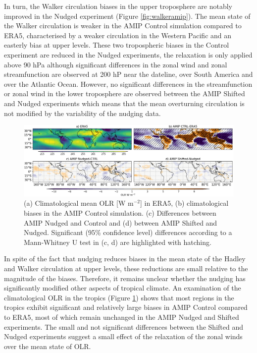 In turn, the Walker circulation biases in the upper troposphere are notably improved in the Nudged experiment (Figure \ref{fig:walkeramip}). The mean state of the Walker circulation is weaker in the AMIP Control simulation compared to ERA5, characterised by a weaker circulation in the Western Pacific and an easterly bias at upper levels. These two tropospheric biases in the Control experiment are reduced in the Nudged experiments, the relaxation is only applied above 90 hPa although significant differences in the zonal wind and zonal streamfunction are observed at 200 hP near the dateline, over South America and over the Atlantic Ocean. 
However, no significant differences in the streamfunction or zonal wind in the lower troposphere are observed between the AMIP Shifted and Nudged experiments which means that the mean overturning circulation is not modified by the variability of the nudging data.

\begin{figure}[b!]
\centering
 \includegraphics[width=\linewidth]{figures/olr_check.png}
\caption[Annual mean OLR  in atmosphere-only experiments]{(a) Climatological mean OLR [W m$^{-2}$] in ERA5, (b) climatological biases in the AMIP Control simulation. (c) Differences between AMIP Nudged and Control and (d) between AMIP Shifted and Nudged. Significant (95\% confidence level) differences according to a Mann-Whitney U test in (c, d) are highlighted with hatching. }
\label{fig:olr-mean}
\end{figure}

In spite of the fact that nudging reduces biases in the mean state of the Hadley and Walker circulation at upper levels, these reductions are small relative to the magnitude of the biases. 
Therefore, it remains unclear whether the nudging has significantly modified other aspects of tropical climate. 
An examination of the climatological  OLR in the tropics (Figure \ref{fig:olr-mean}) shows that most regions in the tropics exhibit significant and relatively large biases in AMIP Control compared to ERA5, most of which remain unchanged in the AMIP Nudged and Shifted experiments. The small and not significant differences between the Shifted and Nudged experiments suggest a small effect of the relaxation of the zonal winds over the mean state of OLR. 


